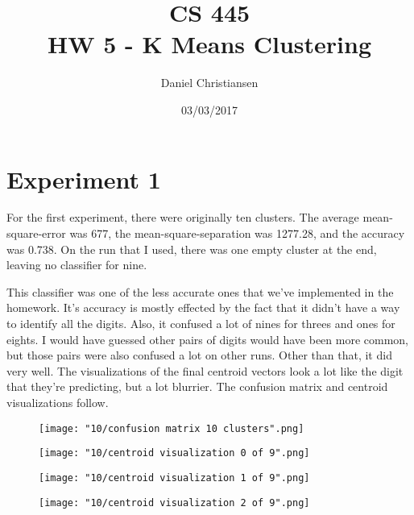 \documentclass{article}
\title{CS 445 \\ HW 5 - K Means Clustering}
\author{Daniel Christiansen}
\date{03/03/2017}
\begin{document}
\maketitle

\clearpage
\section{Experiment 1}

\begin{flushleft}
For the first experiment, there were originally ten clusters.  The average mean-square-error was 677, the mean-square-separation was 1277.28, and the accuracy was 0.738.  On the run that I used, there was one empty cluster at the end, leaving no classifier for nine.
\end{flushleft}

\begin{flushleft}
This classifier was one of the less accurate ones that we've implemented in the homework.  It's accuracy is mostly effected by the fact that it didn't have a way to identify all the digits.  Also, it confused a lot of nines for threes and ones for eights.  I would have guessed other pairs of digits would have been more common, but those pairs were also confused a lot on other runs.  Other than that, it did very well.  The visualizations of the final centroid vectors look a lot like the digit that they're predicting, but a lot blurrier.  The confusion matrix and centroid visualizations follow.
\end{flushleft}

\clearpage

\begin{figure}[h!]
    \noindent\texttt{[image: "10/confusion matrix 10 clusters".png]}
\end{figure}


\begin{figure}[h!]
    \noindent\texttt{[image: "10/centroid visualization 0 of 9".png]}
\end{figure}


\begin{figure}[h!]
    \noindent\texttt{[image: "10/centroid visualization 1 of 9".png]}
\end{figure}


\begin{figure}[h!]
    \noindent\texttt{[image: "10/centroid visualization 2 of 9".png]}
\end{figure}
\end{document}
